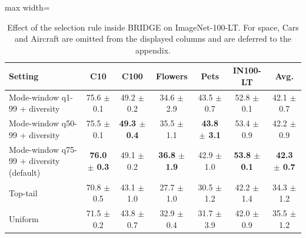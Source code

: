 \begin{table}[t]
\centering
\scriptsize
\setlength{\tabcolsep}{3.5pt}
\caption{Effect of the selection rule inside BRIDGE on ImageNet-100-LT. For space, Cars and Aircraft are omitted from the displayed columns and are deferred to the appendix.}
\label{tab:main_ablation_selection}
\begin{adjustbox}{max width=\textwidth}
\begin{tabular}{l c c c c c c}
\toprule
Setting & C10 & C100 & Flowers & Pets & IN100-LT & Avg. \\
\midrule
Mode-window q1-99 + diversity & 75.6 {\scriptsize$\pm$ 0.1} & 49.2 {\scriptsize$\pm$ 0.2} & 34.6 {\scriptsize$\pm$ 2.9} & 43.5 {\scriptsize$\pm$ 0.7} & 52.8 {\scriptsize$\pm$ 0.1} & 42.1 {\scriptsize$\pm$ 0.7} \\
Mode-window q50-99 + diversity & 75.5 {\scriptsize$\pm$ 0.1} & \textbf{49.3 {\scriptsize$\pm$ 0.4}} & 35.5 {\scriptsize$\pm$ 1.1} & \textbf{43.8 {\scriptsize$\pm$ 3.1}} & 53.4 {\scriptsize$\pm$ 0.9} & 42.2 {\scriptsize$\pm$ 0.9} \\
Mode-window q75-99 + diversity (default) & \textbf{76.0 {\scriptsize$\pm$ 0.3}} & 49.1 {\scriptsize$\pm$ 0.2} & \textbf{36.8 {\scriptsize$\pm$ 1.9}} & 42.9 {\scriptsize$\pm$ 1.0} & \textbf{53.8 {\scriptsize$\pm$ 0.1}} & \textbf{42.3 {\scriptsize$\pm$ 0.7}} \\
Top-tail & 70.8 {\scriptsize$\pm$ 0.5} & 43.1 {\scriptsize$\pm$ 1.0} & 27.7 {\scriptsize$\pm$ 1.0} & 30.5 {\scriptsize$\pm$ 1.2} & 42.2 {\scriptsize$\pm$ 1.4} & 34.3 {\scriptsize$\pm$ 1.2} \\
Uniform & 71.5 {\scriptsize$\pm$ 0.2} & 43.8 {\scriptsize$\pm$ 0.7} & 32.9 {\scriptsize$\pm$ 0.4} & 31.7 {\scriptsize$\pm$ 3.9} & 42.0 {\scriptsize$\pm$ 0.9} & 35.5 {\scriptsize$\pm$ 1.2} \\
\bottomrule
\end{tabular}
\end{adjustbox}
\end{table}
